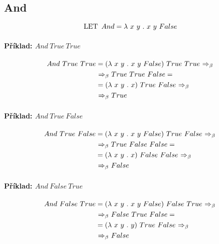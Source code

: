 \subsection{And}

$$ \lklet And = \lk x ~ y \lkdot x ~ y ~ False $$

\paragraph*{Příklad: $And ~ True ~ True$}
\begin{equation}
    \begin{split}
        And ~ True ~ True &= (\lk x ~ y \lkdot x ~ y ~ False) ~ True ~ True \lkbeta \\
        &\lkbeta True ~ True ~ False = \\
        &= (\lk x ~ y \lkdot x) ~ True ~ False \lkbeta \\
        &\lkbeta True
    \end{split}
\end{equation}

\paragraph*{Příklad: $And ~ True ~ False$}
\begin{equation}
    \begin{split}
        And ~ True ~ False &= (\lk x ~ y \lkdot x ~ y ~ False) ~ True ~ False \lkbeta \\
        &\lkbeta True ~ False ~ False = \\
        &= (\lk x ~ y \lkdot x) ~ False ~ False \lkbeta \\
        &\lkbeta False
    \end{split}
\end{equation}

\paragraph*{Příklad: $And ~ False ~ True$}
\begin{equation}
    \begin{split}
        And ~ False ~ True &= (\lk x ~ y \lkdot x ~ y ~ False) ~ False ~ True \lkbeta \\
        &\lkbeta False ~ True ~ False = \\
        &= (\lk x ~ y \lkdot y) ~ True ~ False \lkbeta \\
        &\lkbeta False
    \end{split}
\end{equation}

